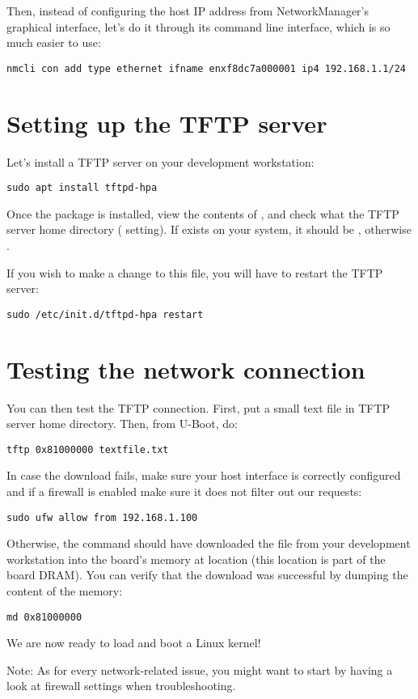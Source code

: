 Then, instead of configuring the host IP address from NetworkManager's
graphical interface, let's do it through its command line interface,
which is so much easier to use:

\begin{verbatim}
nmcli con add type ethernet ifname enxf8dc7a000001 ip4 192.168.1.1/24
\end{verbatim}

\section{Setting up the TFTP server}

Let's install a TFTP server on your development workstation:

\begin{verbatim}
sudo apt install tftpd-hpa
\end{verbatim}

Once the package is installed, view the contents of
, and check what the TFTP server home directory
( setting). If  exists on your system,
it should be , otherwise .

If you wish to make a change to this file, you will have to restart the TFTP server:

\begin{verbatim}
sudo /etc/init.d/tftpd-hpa restart
\end{verbatim}

\section{Testing the network connection}

You can then test the TFTP connection. First, put a small text
file in TFTP server home directory. Then, from U-Boot, do:

\begin{verbatim}
tftp 0x81000000 textfile.txt
\end{verbatim}

In case the download fails, make sure your host interface is correctly
configured and if a firewall is enabled make sure it does not filter out our
requests:
\begin{verbatim}
sudo ufw allow from 192.168.1.100
\end{verbatim}

Otherwise, the  command should have downloaded the
 file from your development workstation into the
board's memory at location  (this location is part of
the board DRAM). You can verify that the download was successful by
dumping the content of the memory:

\begin{verbatim}
md 0x81000000
\end{verbatim}

We are now ready to load and boot a Linux kernel!

Note: As for every network-related issue, you might want to start by
having a look at firewall settings when troubleshooting.
